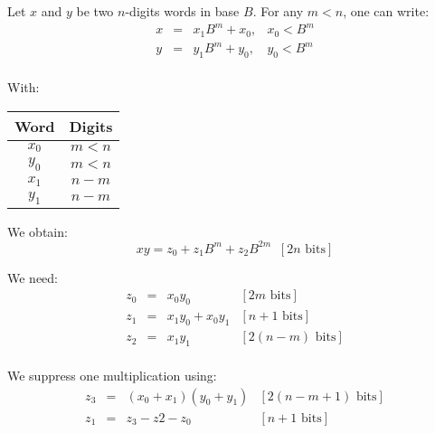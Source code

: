 \documentclass[aps,12pt]{revtex4}
\begin{document}
Let $x$ and $y$ be two $n$-digits words in base $B$.
For any $m<n$, one can write:
\begin{equation}
\begin{array}{rcll}
x & = & x_1 B^m + x_0, & x_0<B^m\\
y & = & y_1 B^m + y_0, & y_0<B^m\\
\end{array}
\end{equation}

With:
\begin{center}
\begin{tabular}{|c|c|}
\hline
Word & Digits\\
\hline
\hline
$x_0$ & $m<n$\\
$y_0$ & $m<n$\\
$x_1$ & $n-m$\\
$y_1$ & $n-m$\\
\hline
\end{tabular}
\end{center}

We obtain:
\begin{equation}
	xy = z_0 + z_1 B^m + z_2 B^{2m}\;\; [2n \text{ bits}]
\end{equation}

We need:
\begin{equation}
\begin{array}{rcll}
	z_0 & = & x_0 y_0           & [2m\text{ bits}]\\
	z_1 & = & x_1 y_0 + x_0 y_1 & [n+1\text{ bits}]\\
	z_2 & = & x_1 y_1           & [2(n-m)\text{ bits}]\\
\end{array}
\end{equation}

We suppress one multiplication using:
\begin{equation}
\begin{array}{rcll}
	z_3 & = & (x_0+x_1) (y_0+y_1) & [2(n-m+1)\text{ bits}] \\
	z_1 & = & z_3 - z2 - z_0      & [n+1\text{ bits}]\\
\end{array}
\end{equation}
\end{document}
